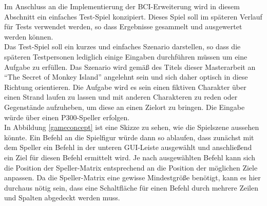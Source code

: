 Im Anschluss an die Implementierung der BCI-Erweiterung wird in diesem Abschnitt ein einfaches Test-Spiel konzipiert.
Dieses Spiel soll im späteren Verlauf für Tests verwendet werden, so dass Ergebnisse gesammelt und ausgewertet werden können.\\

Das Test-Spiel soll ein kurzes und einfaches Szenario darstellen, so dass die späteren Testpersonen lediglich einige Eingaben durchführen müssen um eine Aufgabe zu erfüllen.
Das Szenario wird gemäß des Titels dieser Masterarbeit an "`The Secret of Monkey Island"' angelehnt sein und sich daher optisch in diese Richtung orientieren.
Die Aufgabe wird es sein einen fiktiven Charakter über einen Strand laufen zu lassen und mit anderen Charakteren zu reden oder Gegenstände aufzuheben, 
um diese an einen Zielort zu bringen. 
Die Eingabe würde über einen P300-Speller erfolgen.\\

In Abbildung \ref{gameconcept} ist eine Skizze zu sehen, wie die Spielszene aussehen könnte.
Ein Befehl an die Spielfigur würde dann so ablaufen, dass zunächst mit dem Speller ein Befehl in der unteren GUI-Leiste ausgewählt und anschließend ein Ziel für diesen Befehl ermittelt wird.
Je nach ausgewählten Befehl kann sich die Position der Speller-Matrix entsprechend an die Position der möglichen Ziele anpassen.
Da die Speller-Matrix eine gewisse Mindestgröße benötigt, kann es hier durchaus nötig sein, dass eine Schaltfläche für einen Befehl durch mehrere Zeilen und Spalten abgedeckt werden muss.


